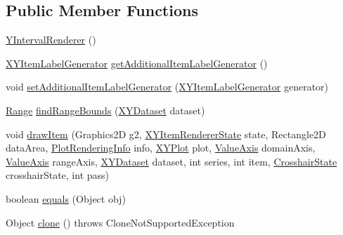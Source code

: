 \subsection*{Public Member Functions}
\begin{DoxyCompactItemize}
\item 
\mbox{\hyperlink{classorg_1_1jfree_1_1chart_1_1renderer_1_1xy_1_1_y_interval_renderer_af055fdf169b5c6ff1aaf10c6ffb1059e}{Y\+Interval\+Renderer}} ()
\item 
\mbox{\hyperlink{interfaceorg_1_1jfree_1_1chart_1_1labels_1_1_x_y_item_label_generator}{X\+Y\+Item\+Label\+Generator}} \mbox{\hyperlink{classorg_1_1jfree_1_1chart_1_1renderer_1_1xy_1_1_y_interval_renderer_aa4c177e06f92f9523a3d9b5bcd5b7cf1}{get\+Additional\+Item\+Label\+Generator}} ()
\item 
void \mbox{\hyperlink{classorg_1_1jfree_1_1chart_1_1renderer_1_1xy_1_1_y_interval_renderer_a3613de69d575ab248cd6aeb051243e7f}{set\+Additional\+Item\+Label\+Generator}} (\mbox{\hyperlink{interfaceorg_1_1jfree_1_1chart_1_1labels_1_1_x_y_item_label_generator}{X\+Y\+Item\+Label\+Generator}} generator)
\item 
\mbox{\hyperlink{classorg_1_1jfree_1_1data_1_1_range}{Range}} \mbox{\hyperlink{classorg_1_1jfree_1_1chart_1_1renderer_1_1xy_1_1_y_interval_renderer_a27eacc42fdc720481b38c2e69c682ba7}{find\+Range\+Bounds}} (\mbox{\hyperlink{interfaceorg_1_1jfree_1_1data_1_1xy_1_1_x_y_dataset}{X\+Y\+Dataset}} dataset)
\item 
void \mbox{\hyperlink{classorg_1_1jfree_1_1chart_1_1renderer_1_1xy_1_1_y_interval_renderer_a43d466c38e50d11a599186e4e3b569c1}{draw\+Item}} (Graphics2D g2, \mbox{\hyperlink{classorg_1_1jfree_1_1chart_1_1renderer_1_1xy_1_1_x_y_item_renderer_state}{X\+Y\+Item\+Renderer\+State}} state, Rectangle2D data\+Area, \mbox{\hyperlink{classorg_1_1jfree_1_1chart_1_1plot_1_1_plot_rendering_info}{Plot\+Rendering\+Info}} info, \mbox{\hyperlink{classorg_1_1jfree_1_1chart_1_1plot_1_1_x_y_plot}{X\+Y\+Plot}} plot, \mbox{\hyperlink{classorg_1_1jfree_1_1chart_1_1axis_1_1_value_axis}{Value\+Axis}} domain\+Axis, \mbox{\hyperlink{classorg_1_1jfree_1_1chart_1_1axis_1_1_value_axis}{Value\+Axis}} range\+Axis, \mbox{\hyperlink{interfaceorg_1_1jfree_1_1data_1_1xy_1_1_x_y_dataset}{X\+Y\+Dataset}} dataset, int series, int item, \mbox{\hyperlink{classorg_1_1jfree_1_1chart_1_1plot_1_1_crosshair_state}{Crosshair\+State}} crosshair\+State, int pass)
\item 
boolean \mbox{\hyperlink{classorg_1_1jfree_1_1chart_1_1renderer_1_1xy_1_1_y_interval_renderer_ab292e22ca438b6cf0d390cb05c5f45f3}{equals}} (Object obj)
\item 
Object \mbox{\hyperlink{classorg_1_1jfree_1_1chart_1_1renderer_1_1xy_1_1_y_interval_renderer_ac9257dc0d243f361c637901b49ff953d}{clone}} ()  throws Clone\+Not\+Supported\+Exception 
\end{DoxyCompactItemize}
